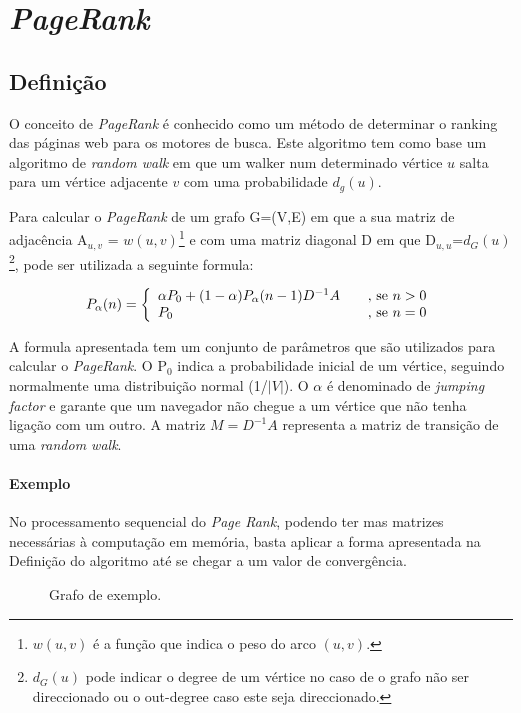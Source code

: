 \documentclass[a4paper,10pt]{report}
\begin{document}
\section*{\textit{PageRank}}

  \subsection*{Definição}\label{pr}

  O conceito de \textit{PageRank} é conhecido como um método de determinar o ranking das páginas web para os motores de busca. 
  Este algoritmo tem como base um algoritmo de \textit{random walk} em que um walker num determinado vértice $u$ salta para um vértice adjacente $v$ com uma probabilidade $d_g(u)$.
  
  Para calcular o \textit{PageRank} de um grafo G=(V,E) em que a sua matriz de adjacência A$_{u,v}$ = $w(u,v)$\footnote{$w(u,v)$ é a função que indica o peso do arco $(u,v)$.} e com uma matriz diagonal D em que D$_{u,u}$=$d_G(u)$\footnote{$d_G(u)$ pode indicar o degree de um vértice no caso de o grafo não ser direccionado ou o out-degree caso este seja direccionado.}, pode ser utilizada a seguinte formula:
  
\[ P_\alpha(n) = \left\{
  \begin{array}{l l}
    \alpha P_0+(1-\alpha)P_\alpha(n-1)D^{{-}1}A & \quad \text{, se } n>0   \\
    P_0 & \quad \text{, se }n=0 
  \end{array} \right.\]
  
  A formula apresentada tem um conjunto de parâmetros que são utilizados para calcular o \textit{PageRank}. O P$_0$ indica a probabilidade inicial de um vértice, seguindo normalmente uma distribuição normal (1/$|V|$). O $\alpha$ é denominado de \textit{jumping factor} e garante que um navegador não chegue a um vértice que não tenha ligação com um outro. A matriz $M=D^{{-}1}A$ representa a matriz de transição de uma \textit{random walk}.
  
  \paragraph{Exemplo}  
  No processamento sequencial do \textit{Page Rank}, podendo ter mas matrizes necessárias à computação em memória, basta aplicar a forma apresentada na Definição do algoritmo até se chegar a um valor de convergência.
   
  \begin{figure}[h]
    \centering
    \caption{Grafo de exemplo.}
    \label{graph}
  \end{figure}
\end{document}
